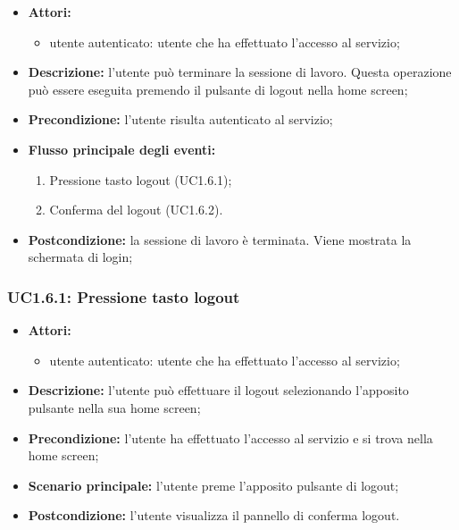 \begin{itemize}
	\item \textbf{Attori:}
	\begin{itemize}
		\item utente autenticato: utente che ha effettuato l'accesso al servizio;
	\end{itemize}
	\item \textbf{Descrizione:} l'utente può terminare la sessione di lavoro. Questa operazione può essere eseguita premendo il pulsante di logout nella home screen;
	\item \textbf{Precondizione:} l'utente risulta autenticato al servizio;
	\item \textbf{Flusso principale degli eventi:}
	\begin{enumerate}
		\item Pressione tasto logout (UC1.6.1);
		\item Conferma del logout (UC1.6.2).
	\end{enumerate}
	\item \textbf{Postcondizione:} la sessione di lavoro è terminata. Viene mostrata la schermata di login;
\end{itemize}

\subsubsection{UC1.6.1: Pressione tasto logout}
\begin{itemize}
	\item \textbf{Attori:}
	\begin{itemize}
		\item utente autenticato: utente che ha effettuato l'accesso al servizio;
	\end{itemize}
	\item \textbf{Descrizione:} l'utente può effettuare il logout selezionando l'apposito pulsante nella sua home screen;
	\item \textbf{Precondizione:} l'utente ha effettuato l'accesso al servizio e si trova nella home screen;
	\item \textbf{Scenario principale:} l'utente preme l'apposito pulsante di logout;
	\item \textbf{Postcondizione:} l'utente visualizza il pannello di conferma logout.
\end{itemize}

